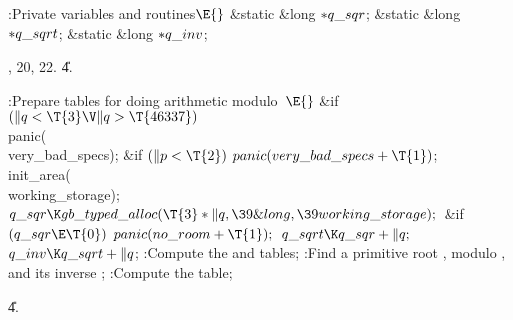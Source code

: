 \Y\B\4:Private variables and routines\X${}\E{}$\6
\&{static} \&{long} ${}{*}\\{q\_sqr}{}$;\6
\&{static} \&{long} ${}{*}\\{q\_sqrt}{}$;\6
\&{static} \&{long} ${}{*}\\{q\_inv}{}$;\par
{}, 20, 22.
\U4.\fi

\B{}:Prepare tables for doing arithmetic modulo~\X${}\E{}$\6
\&{if} ${}(\|q<\T{3}\V\|q>\T{46337}){}$\1\5
\\{panic}(\\{very\_bad\_specs});%
\2\6
\&{if} ${}(\|p<\T{2}){}$\1\5
${}\\{panic}(\\{very\_bad\_specs}+\T{1}){}$;\2\6
\\{init\_area}(\\{working\_storage});\6
${}\\{q\_sqr}\K\\{gb\_typed\_alloc}(\T{3}*\|q,\39\&{long},\39\\{working%
\_storage});{}$\6
\&{if} ${}(\\{q\_sqr}\E\T{0}){}$\1\5
${}\\{panic}(\\{no\_room}+\T{1});{}$\2\6
${}\\{q\_sqrt}\K\\{q\_sqr}+\|q;{}$\6
${}\\{q\_inv}\K\\{q\_sqrt}+\|q{}$;\6
:Compute the  and  tables\X;\6
:Find a primitive root , modulo , and its inverse \X;\6
:Compute the  table\X;\par
\U4.\fi

